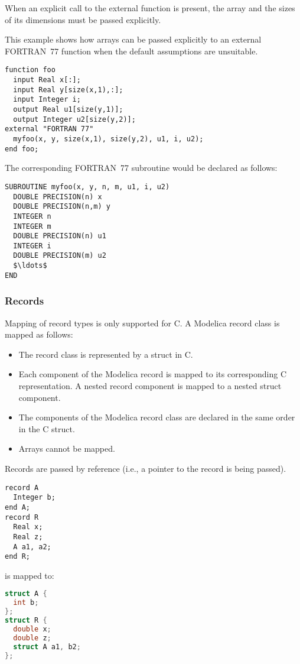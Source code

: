 When an explicit call to the external function is present, the array and the sizes of its dimensions must be passed explicitly.

\begin{example}
This example shows how arrays can be passed explicitly to an external FORTRAN~77 function when the default assumptions are unsuitable.

\begin{lstlisting}[language=modelica]
function foo
  input Real x[:];
  input Real y[size(x,1),:];
  input Integer i;
  output Real u1[size(y,1)];
  output Integer u2[size(y,2)];
external "FORTRAN 77"
  myfoo(x, y, size(x,1), size(y,2), u1, i, u2);
end foo;
\end{lstlisting}
The corresponding FORTRAN~77 subroutine would be declared as follows:
\begin{lstlisting}[language=FORTRAN77]
SUBROUTINE myfoo(x, y, n, m, u1, i, u2)
  DOUBLE PRECISION(n) x
  DOUBLE PRECISION(n,m) y
  INTEGER n
  INTEGER m
  DOUBLE PRECISION(n) u1
  INTEGER i
  DOUBLE PRECISION(m) u2
  $\ldots$
END
\end{lstlisting}
\end{example}

\subsubsection{Records}\label{records}

Mapping of record types is only supported for C.
A Modelica record class is mapped as follows:
\begin{itemize}
\item
  The record class is represented by a struct in C.
\item
  Each component of the Modelica record is mapped to its corresponding C representation.
  A nested record component is mapped to a nested struct component.
\item
  The components of the Modelica record class are declared in the same order in the C struct.
\item
  Arrays cannot be mapped.
\end{itemize}

Records are passed by reference (i.e., a pointer to the record is being passed).

\begin{example}
\begin{lstlisting}[language=modelica]
record A
  Integer b;
end A;
record R
  Real x;
  Real z;
  A a1, a2;
end R;
\end{lstlisting}
is mapped to:
\begin{lstlisting}[language=C]
struct A {
  int b;
};
struct R {
  double x;
  double z;
  struct A a1, b2;
};
\end{lstlisting}
\end{example}

